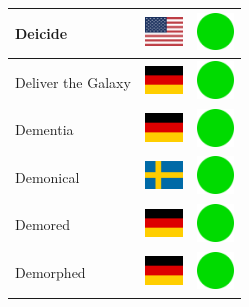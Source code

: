 \documentclass[12pt, a4paper, twoside]{report}
\begin{document}
\begin{center}
\begin{longtable}{|p{5cm}|p{2cm}|p{2cm}|}
 Deicide                                                    & \includegraphics[width=1cm]{../img/flags/us} &   \includegraphics[width=1cm]{../likes/y} \\ \hline
 Deliver the Galaxy                                         & \includegraphics[width=1cm]{../img/flags/de} &   \includegraphics[width=1cm]{../likes/y} \\ \hline
 Dementia                                                   & \includegraphics[width=1cm]{../img/flags/de} &   \includegraphics[width=1cm]{../likes/y} \\ \hline
 Demonical                                                  & \includegraphics[width=1cm]{../img/flags/se} &   \includegraphics[width=1cm]{../likes/y} \\ \hline
 Demored                                                    & \includegraphics[width=1cm]{../img/flags/de} &   \includegraphics[width=1cm]{../likes/y} \\ \hline
 Demorphed                                                  & \includegraphics[width=1cm]{../img/flags/de} &   \includegraphics[width=1cm]{../likes/y} \\ \hline

\end{longtable}
\end{center}
\end{document}
